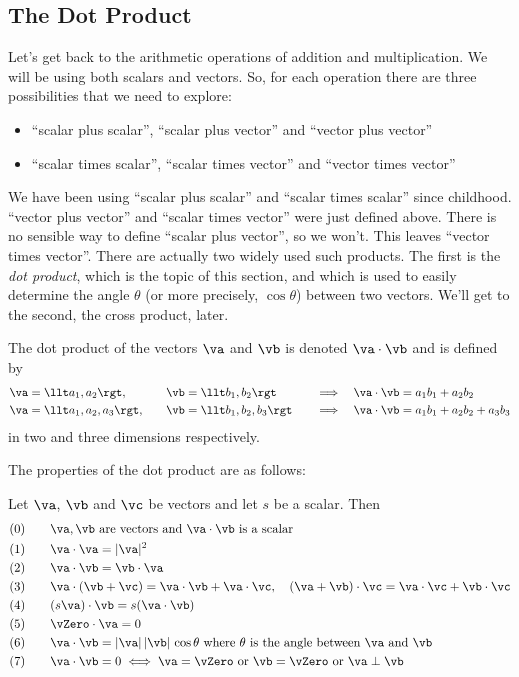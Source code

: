 \subsection{The Dot Product}
Let's get back to the arithmetic operations of addition and multiplication.
We will be using both scalars and vectors. So, for each operation there are 
three possibilities that we need to explore: 
\begin{itemize}\itemsep1pt \parskip0pt 
\item ``scalar plus scalar'', ``scalar plus vector'' and ``vector plus vector''
\item``scalar times scalar'', ``scalar times vector'' and 
         ``vector times vector''
\end{itemize}
We have been using ``scalar plus scalar'' and ``scalar times scalar''
since childhood. ``vector plus vector'' and ``scalar times vector''
were just defined above. There is no sensible way to define ``scalar plus vector'', so we won't. This leaves ``vector times vector''. 
There are actually two widely used such products.
The first is the \emph{dot product}, which is the topic of this section,
and which is used to easily determine the angle $\theta$ (or more precisely,
$\cos\theta$) between two vectors.
We'll get to the second, the cross product, later. 
\begin{defn}\label{def:dotProd}
The dot product of the vectors $\va$ and $\vb$ is denoted $\va\cdot\vb$ 
and is defined by
\begin{alignat*}{5}
&\va=\llt a_1,a_2\rgt ,\quad &&\vb=\llt b_1,b_2\rgt\quad &\implies\quad
&\va\cdot\vb = a_1b_1+a_2b_2\\
&\va=\llt a_1,a_2,a_3\rgt ,\quad &&\vb=\llt b_1,b_2,b_3\rgt\quad &\implies\quad
&\va\cdot\vb = a_1b_1+a_2b_2+a_3b_3
\end{alignat*}
in two and three dimensions respectively. 
\end{defn}
The properties of the dot 
product are as follows:
\begin{theorem}\label{thm:dotPppties}
Let $\va$, $\vb$ and $\vc$ be vectors and let $s$ be a scalar. Then
\begin{alignat*}{3}
&(0)\quad &&\va,\vb\text{ are vectors and }\va\cdot\vb
              \text{ is a scalar}\\
&(1) &&\va\cdot\va=|\va|^2\\
&(2) &&\va\cdot\vb=\vb\cdot\va\\
&(3) &&\va\cdot(\vb+\vc)=\va\cdot\vb+\va\cdot\vc,\quad 
       (\va+\vb)\cdot\vc=\va\cdot\vc+\vb\cdot\vc\\
&(4) &&(s\va)\cdot\vb= s(\va\cdot\vb)\\
&(5)  &&\vZero \cdot\va=0\\
&(6) &&\va\cdot\vb=|\va|\,|\vb|\,\cos\theta
        \text{ where $\theta$ is the angle between $\va$ and $\vb$}\\
&(7) &&\va\cdot\vb=0\iff \va=\vZero \text{ or }\vb=\vZero 
    \text{ or } \va\perp\vb
\end{alignat*}
\end{theorem}
